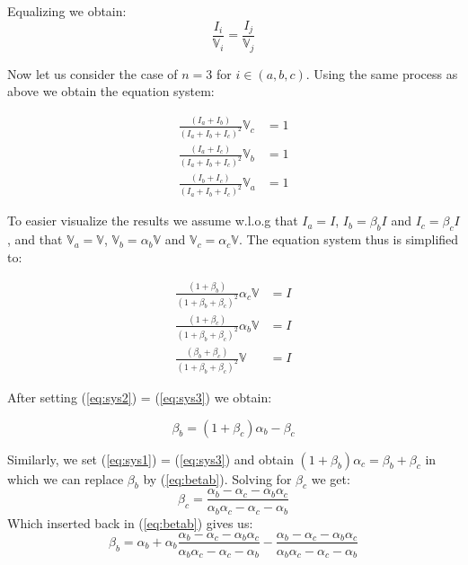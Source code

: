 Equalizing we obtain:
\begin{equation}
    \frac{I_i}{\mathbb{V}_i} = \frac{I_j}{\mathbb{V}_j} 
\end{equation}

Now let us consider the case of $n=3$ for $i \in (a,b,c)$. Using the same process as above we obtain the equation system:

\begin{align}
    \frac{(I_a+I_b)}{(I_a+I_b+I_c)^2}\mathbb{V}_c&=1\\
    \frac{(I_a+I_c)}{(I_a+I_b+I_c)^2}\mathbb{V}_b&=1\\
    \frac{(I_b+I_c)}{(I_a+I_b+I_c)^2}\mathbb{V}_a&=1
\end{align}

To easier visualize the results we assume w.l.o.g that $I_a = I$, $I_b = \beta_b I$ and $ I_c = \beta_c I $, and that $\mathbb{V}_a = \mathbb{V}$, $\mathbb{V}_b = \alpha_b \mathbb{V} $ and $\mathbb{V}_c = \alpha_c \mathbb{V}$. The equation system thus is simplified to:

\begin{align}
    \label{eq:sys1}\frac{(1+\beta_b)}{(1+\beta_b+ \beta_c )^2}\alpha_c\mathbb{V}&=I\\
    \label{eq:sys2}\frac{(1+\beta_c )}{(1+\beta_b  + \beta_c )^2}\alpha_b\mathbb{V}&=I\\
    \label{eq:sys3}\frac{(\beta_b +\beta_c )}{(1+\beta_b  + \beta_c )^2}\mathbb{V}&=I
\end{align}

After setting (\ref{eq:sys2}) = (\ref{eq:sys3}) we obtain:

\begin{equation}
    \label{eq:betab}\beta_b=(1+\beta_c)\alpha_b-\beta_c
\end{equation}

Similarly, we set (\ref{eq:sys1}) = (\ref{eq:sys3}) and obtain $(1+\beta_b)\alpha_c=\beta_b+\beta_c$ in which we can replace $\beta_b$ by (\ref{eq:betab}). Solving for $\beta_c$ we get:
\begin{equation}
\label{eq:betac}
    \beta_c = \frac{\alpha_b-\alpha_c-\alpha_b\alpha_c}{\alpha_b\alpha_c-\alpha_c-\alpha_b}
\end{equation}
Which inserted back in (\ref{eq:betab}) gives us:
\begin{equation}
\label{eq:betab2}
    \beta_b=\alpha_b + \alpha_b\frac{\alpha_b-\alpha_c-\alpha_b\alpha_c}{\alpha_b\alpha_c-\alpha_c-\alpha_b}-\frac{\alpha_b-\alpha_c-\alpha_b\alpha_c}{\alpha_b\alpha_c-\alpha_c-\alpha_b}
\end{equation}

